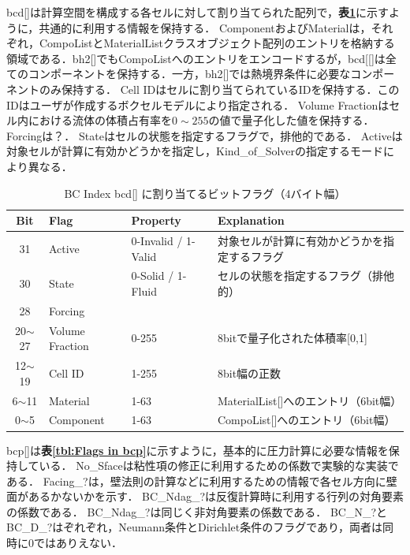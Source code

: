 bcd[]は計算空間を構成する各セルに対して割り当てられた配列で，\textbf{表\ref{tbl:Flags in bcd}}に示すように，共通的に利用する情報を保持する．
ComponentおよびMaterialは，それぞれ，CompoListとMaterialListクラスオブジェクト配列のエントリを格納する領域である．bh2[]でもCompoListへのエントリをエンコードするが，bcd[[]は全てのコンポーネントを保持する．一方，bh2[]では熱境界条件に必要なコンポーネントのみ保持する．
Cell IDはセルに割り当てられているIDを保持する．このIDはユーザが作成するボクセルモデルにより指定される．
Volume Fractionはセル内における流体の体積占有率を$0\sim255$の値で量子化した値を保持する．
Forcingは？．
Stateはセルの状態を指定するフラグで，排他的である．
Activeは対象セルが計算に有効かどうかを指定し，Kind\_of\_Solverの指定するモードにより異なる．

\begin{table}[htdp]
\caption{BC Index bcd[] に割り当てるビットフラグ（4バイト幅）}
\begin{center}
\small
\begin{tabular}{clll} \toprule
Bit & Flag & Property & Explanation\\ \midrule
31 & Active & 0-Invalid / 1-Valid & 対象セルが計算に有効かどうかを指定するフラグ\\
30 & State  & 0-Solid / 1-Fluid & セルの状態を指定するフラグ（排他的）\\
28 & Forcing & & \\
20$\sim$27 & Volume Fraction & 0-255 & 8bitで量子化された体積率[0,1]\\
12$\sim$19 & Cell ID & 1-255 & 8bit幅の正数\\
6$\sim$11 & Material & 1-63 & MaterialList[]へのエントリ（6bit幅）\\
0$\sim$5 & Component & 1-63 & CompoList[]へのエントリ（6bit幅）\\ \bottomrule
\end{tabular}
\end{center}
\label{tbl:Flags in bcd}
\end{table}

bcp[]は\textbf{表\ref{tbl:Flags in bcp}}に示すように，基本的に圧力計算に必要な情報を保持している．
No\_Sfaceは粘性項の修正に利用するための係数で実験的な実装である．
Facing\_?は，壁法則の計算などに利用するための情報で各セル方向に壁面があるかないかを示す．
BC\_Ndag\_?は反復計算時に利用する行列の対角要素の係数である．
BC\_Ndag\_?は同じく非対角要素の係数である．
BC\_N\_?とBC\_D\_?はぞれぞれ，Neumann条件とDirichlet条件のフラグであり，両者は同時に0ではありえない．

